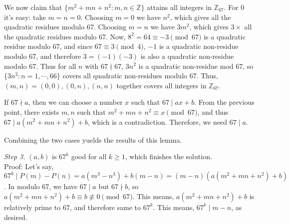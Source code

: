 \documentclass[12pt]{article}
\newcommand{\bbZ}{\mathbb Z}
\newcommand{\<}{\langle}
\renewcommand{\>}{\rangle}
\begin{document}
\begin{enumerate}
\begin{itemize}
		We now claim that $\{m^2+mn+n^2:m, n\in\bbZ\}$ attains all integers in $\bbZ_{67}$. For $0$ it's easy: take $m=n=0$. Choosing $m=0$ we have $n^2$, which gives all the quadratic residues modulo 67. Choosing $m=n$ we have $3m^2$, which gives $3\times$ all the quadratic residues modulo 67. 
		Now, $8^2=64\equiv-3\pmod{67}$ is a quadratic residue modulo 67, and since $67\equiv 3\pmod{4}$, $-1$ is a quadratic non-residue modulo 67, and therefore $3=(-1)(-3)$ is also a quadratic non-residue modulo 67. 
		Thus for all $n$ with $67\nmid 67$, $3n^2$ is a quadratic non-residue mod 67, so $\{3n^2: n=1, \cdots , 66\}$ covers all quadratic non-residues modulo 67. Thus, 
		$(m, n)=(0, 0), (0, n), (n, n)$ together covers all integers in $\bbZ_{67}$. 
		
		If $67\nmid a$, then we can choose a number $x$ such that $67\mid ax+b$. From the previous point, there exists $m, n$ such that $m^2+mn+n^2\equiv x\pmod{67}$, and thus $67\mid a(m^2+mn+n^2)+b$, which is a contradiction. 
		Therefore, we need $67\mid a$. 
	\end{itemize}
	
	Combining the two cases yuelds the results of this lemma. 
	
	\emph{Step 3.} $(a, b)$ is $67^k$ good for all $k\ge 1$, which finishes the solution. \\
	Proof: Let's say, $67^k\mid P(m)-P(n)=a(m^3-n^3)+b(m-n)=(m-n)(a(m^2+mn+n^2)+b)$. 
	In modulo $67$, we have $67\mid a$ but $67\nmid b$, so $a(m^2+mn+n^2)+b\equiv b\not\equiv 0\pmod{67}$. This means, $a(m^2+mn+n^2)+b$ is relatively prime to $67$, and therefore same to $67^k$. This means, $67^k\mid m-n$, as desired. 
	
\end{enumerate}
	
	
\end{document}
